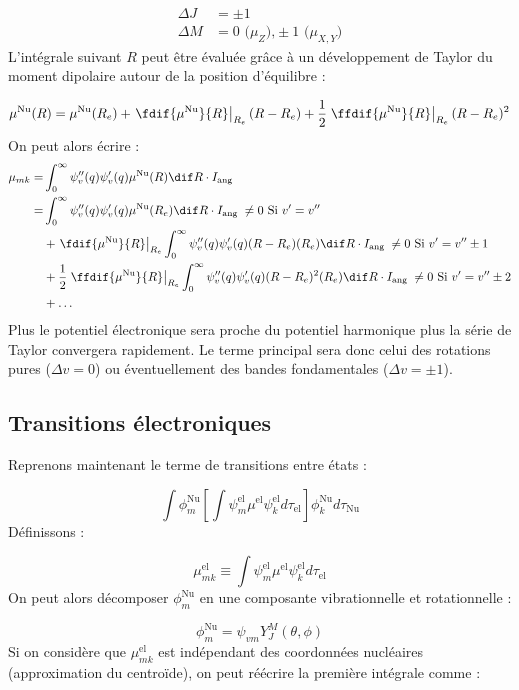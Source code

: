 \begin{align*}
    \Delta J &= \pm1\\
    \Delta M &= 0 \textrm{ ($\mu_Z$),} \pm1 \textrm{ ($\mu_{X,Y}$)}
\end{align*}
L'intégrale suivant $R$ peut être évaluée grâce à un développement de Taylor du moment dipolaire autour de la position d'équilibre :

\[
    \mu^\text{Nu}(R) = \mu^\text{Nu}(R_e) + \left.\fdif{\mu^\text{Nu}}{R}\right|_{R_e}(R-R_e) + \dfrac{1}{2}\left.\ffdif{\mu^\text{Nu}}{R}\right|_{R_e}(R-R_e)^2
\]
On peut alors écrire :
\begin{align*}
    \mu_{mk} =& \int^{\infty}_0\psi_v''(q)\psi_v'(q)\mu^\text{Nu}(R)\dif R \cdot I_\text{ang}\\
        =& \int^{\infty}_0\psi_v''(q)\psi_v'(q)\mu^\text{Nu}(R_e)\dif R \cdot I_\text{ang} \; \neq 0 \textrm{ Si $v' = v''$}\\
        &+ \left.\fdif{\mu^\text{Nu}}{R}\right|_{R_e}\int^{\infty}_0\psi_v''(q)\psi_v'(q)(R-R_e)(R_e)\dif R \cdot I_\text{ang} \; \neq 0 \textrm{ Si $v' = v''\pm1$}\\
        &+ \dfrac{1}{2}\left.\ffdif{\mu^\text{Nu}}{R}\right|_{R_e}\int^{\infty}_0\psi_v''(q)\psi_v'(q)(R-R_e)^2(R_e)\dif R \cdot I_\text{ang} \; \neq 0 \textrm{ Si $v' = v''\pm2$}\\
        &+ \hdots
\end{align*}
Plus le potentiel électronique sera proche du potentiel harmonique plus la série de Taylor convergera rapidement. Le terme principal sera donc celui des rotations pures ($\Delta v = 0$) ou éventuellement des bandes fondamentales ($\Delta v = \pm1$).


\subsection{Transitions électroniques}

Reprenons maintenant le terme de transitions entre états :

\[
    \int \phi^\text{Nu}_m\left[\int \psi^\text{el}_m\mu^\text{el}\psi^\text{el}_kd\tau_\text{el} \right]\phi^\text{Nu}_kd\tau_\text{Nu}
\]
Définissons :

\[
    \mu^\text{el}_{mk} \equiv \int \psi^\text{el}_m\mu^\text{el}\psi^\text{el}_kd\tau_\text{el}
\]
On peut alors décomposer $\phi_m^\text{Nu}$ en une composante vibrationnelle et rotationnelle :

\[ \phi_m^\text{Nu} = \psi_{vm}Y_J^M(\theta,\phi) \]
Si on considère que $\mu^\text{el}_{mk}$ est indépendant des coordonnées nucléaires (approximation du centroïde), on peut réécrire la première intégrale comme :

